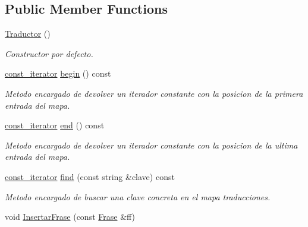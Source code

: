 \subsection*{Public Member Functions}
\begin{DoxyCompactItemize}
\item 
\hyperlink{class_traductor_a9723a49b5b82689bff2b827ca2da3f45}{Traductor} ()\hypertarget{class_traductor_a9723a49b5b82689bff2b827ca2da3f45}{}\label{class_traductor_a9723a49b5b82689bff2b827ca2da3f45}

\begin{DoxyCompactList}\small\item\em Constructor por defecto. \end{DoxyCompactList}\item 
\hyperlink{class_traductor_1_1const__iterator}{const\+\_\+iterator} \hyperlink{class_traductor_a4af21754c460def90bc2a9e11166fde2}{begin} () const 
\begin{DoxyCompactList}\small\item\em Metodo encargado de devolver un iterador constante con la posicion de la primera entrada del mapa. \end{DoxyCompactList}\item 
\hyperlink{class_traductor_1_1const__iterator}{const\+\_\+iterator} \hyperlink{class_traductor_a149165eba2b47a9e5942369cb139be9b}{end} () const 
\begin{DoxyCompactList}\small\item\em Metodo encargado de devolver un iterador constante con la posicion de la ultima entrada del mapa. \end{DoxyCompactList}\item 
\hyperlink{class_traductor_1_1const__iterator}{const\+\_\+iterator} \hyperlink{class_traductor_a8992959f19a78b5cd0a96a5227170d31}{find} (const string \&clave) const 
\begin{DoxyCompactList}\small\item\em Metodo encargado de buscar una clave concreta en el mapa traducciones. \end{DoxyCompactList}\item 
void \hyperlink{class_traductor_a2f7bd688f7724944c9093970fd32c5eb}{Insertar\+Frase} (const \hyperlink{class_frase}{Frase} \&ff)\hypertarget{class_traductor_a2f7bd688f7724944c9093970fd32c5eb}{}\label{class_traductor_a2f7bd688f7724944c9093970fd32c5eb}


\end{DoxyCompactItemize}
